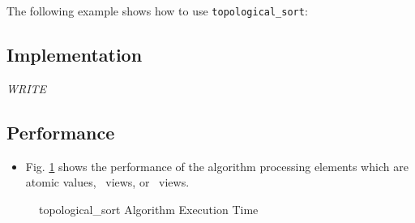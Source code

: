 The following example shows how to use 
\texttt{topological\_sort}:


\subsection{Implementation} \label{sec-topsort-alg-impl}

\textit{WRITE}

\subsection{Performance} \label{sec-topsort-alg-perf}

\begin{itemize}
\item
Fig. \ref{fig:topsort-alg-exec-exper}
shows the performance of the algorithm processing
elements which are atomic values, \stl\ views, or \stapl\ views.
\end{itemize}

\begin{figure}[p]
\caption{ topological\_sort Algorithm Execution Time}
\label{fig:topsort-alg-exec-exper}
\end{figure}


